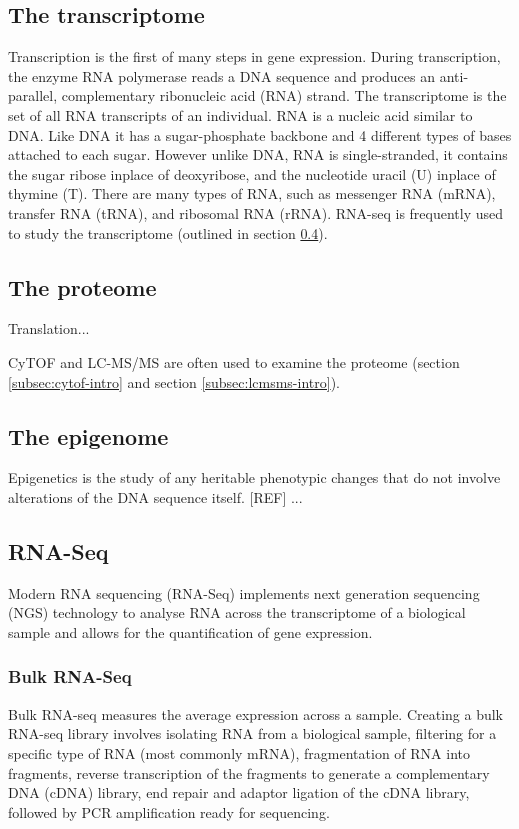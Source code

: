 
\subsection{The transcriptome}
Transcription is the first of many steps in gene expression.
During transcription, the enzyme RNA polymerase reads a DNA sequence and produces an anti-parallel, complementary ribonucleic acid (RNA) strand.
The transcriptome is the set of all RNA transcripts of an individual.
RNA is a nucleic acid similar to DNA\@.
Like DNA it has a sugar-phosphate backbone and 4 different types of bases attached to each sugar.
However unlike DNA, RNA is single-stranded, it contains the sugar ribose inplace of deoxyribose, and the nucleotide uracil (U) inplace of thymine (T).
There are many types of RNA, such as messenger RNA (mRNA), transfer RNA (tRNA), and ribosomal RNA (rRNA).
RNA-seq is frequently used to study the transcriptome (outlined in section \ref{subsec:rna-seq-intro}).

\subsection{The proteome}
Translation...

CyTOF and LC-MS/MS are often used to examine the proteome (section \ref{subsec:cytof-intro} and section \ref{subsec:lcmsms-intro}).

\subsection{The epigenome}
Epigenetics is the study of any heritable phenotypic changes that do not involve alterations of the DNA sequence itself. [REF]
...


\subsection{RNA-Seq}\label{subsec:rna-seq-intro}
Modern RNA sequencing (RNA-Seq) implements next generation sequencing (NGS) technology to analyse RNA across the transcriptome of a biological sample and allows for the quantification of gene expression.

\subsubsection{Bulk RNA-Seq}
Bulk RNA-seq measures the average expression across a sample.
Creating a bulk RNA-seq library involves isolating RNA from a biological sample, filtering for a specific type of RNA (most commonly mRNA), fragmentation of RNA into fragments, reverse transcription of the fragments to generate a complementary DNA (cDNA) library, end repair and adaptor ligation of the cDNA library, followed by PCR amplification ready for sequencing.

